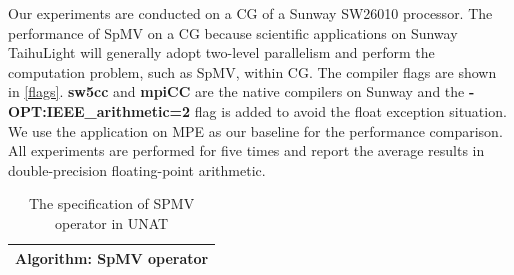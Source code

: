 \documentclass[conference]{IEEEtran}
\begin{document}
Our experiments are conducted on a CG of a Sunway SW26010 processor. The performance of SpMV on a CG because scientific applications on Sunway TaihuLight will generally adopt two-level parallelism and perform the computation problem, such as SpMV, within CG. The compiler flags are shown in \ref{flags}. \textbf{sw5cc} and \textbf{mpiCC} are the native compilers on Sunway and the \textbf{-OPT:IEEE\_arithmetic=2} flag is added to avoid the float exception situation. We use the application on MPE as our baseline for the performance comparison. All experiments are performed for five times and report the average results in double-precision floating-point arithmetic.


\begin{table}[]
\caption{The specification of SPMV operator in UNAT}
\begin{tabular}{l}
\hline Algorithm: SpMV operator                                                                                                                                                                                                                                                                                                                                                                                                                                                                                                                                                                                                                                                                                                                                                                                                                                                                                                                                                                                                                                                                                                                                                                                                                                                                                                                                                                                          \\ \hline

\end{tabular}
\end{table}
\end{document}
